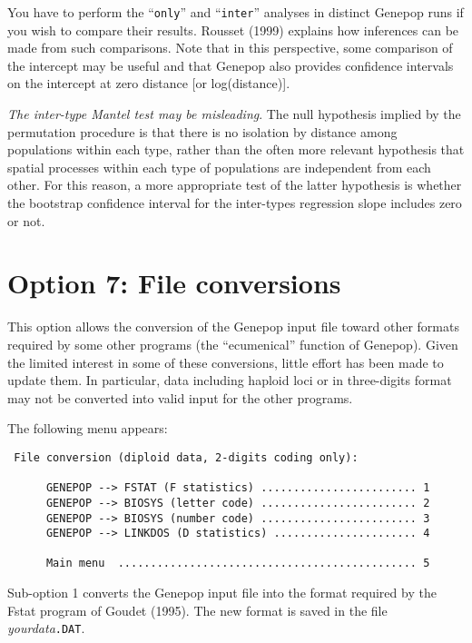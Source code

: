 \documentclass[12pt,]{book}
\begin{document}
You have to perform the ``\texttt{only}'' and ``\texttt{inter}''
analyses in distinct Genepop runs if you wish to compare their results.
Rousset (1999) explains how inferences can be made from such
comparisons. Note that in this perspective, some comparison of the
intercept may be useful and that Genepop also provides confidence
intervals on the intercept at zero distance {[}or log(distance){]}.

\emph{The inter-type Mantel test may be
misleading}. The null hypothesis implied by
the permutation procedure is that there is no isolation by distance
among populations within each type, rather than the often more relevant
hypothesis that spatial processes within each type of populations are
independent from each other. For this reason, a more appropriate test of
the latter hypothesis is whether the bootstrap confidence interval for
the inter-types regression slope includes zero or not.

\section{Option 7: File conversions}\label{option-7-file-conversions}

This option allows the conversion of the Genepop input file toward other
formats required by some other programs (the ``ecumenical'' function of
Genepop). Given the limited interest in some of these conversions,
little effort has been made to update them. In particular, data
including haploid loci or in three-digits format may
not be converted into valid input for the other programs.

The following menu appears:

\begin{verbatim}
 File conversion (diploid data, 2-digits coding only):

      GENEPOP --> FSTAT (F statistics) ........................ 1
      GENEPOP --> BIOSYS (letter code) ........................ 2
      GENEPOP --> BIOSYS (number code) ........................ 3
      GENEPOP --> LINKDOS (D statistics) ...................... 4

      Main menu  .............................................. 5
\end{verbatim}

Sub-option 1 converts the Genepop input file into the format required by
the Fstat program of Goudet (1995). The new format
is saved in the file \emph{yourdata}\texttt{.DAT}.
\end{document}
